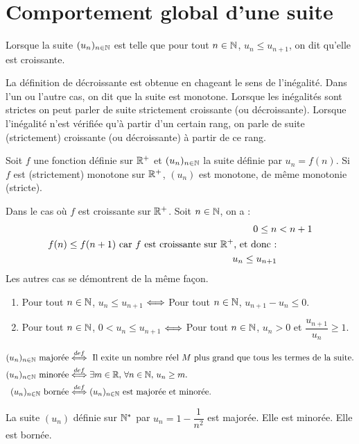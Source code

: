\documentclass[a4paper,11pt,DIV14,BCOR0mm]{scrartcl}
\begin{document}
\section{Comportement global d'une suite}
\begin{definition}
 Lorsque la suite $(u_n)_{n\in\mathbb{N}}$ est telle que pour tout $n\in\mathbb{N}$, $u_n\leq u_{n+1}$,
on dit qu'elle est croissante.
\end{definition}
La définition de décroissante est obtenue en chageant le sens de l'inégalité. Dans l'un ou l'autre
cas, on dit que la suite est monotone.
Lorsque les inégalités
sont strictes on peut parler de suite strictement croissante (ou décroissante). 
Lorsque l'inégalité n'est vérifiée
qu'à partir d'un certain rang, on parle de suite (strictement) croissante (ou décroissante) à partir 
de ce rang.
\begin{theoreme}
 Soit $f$ une fonction définie sur $\mathbb{R}^+$ et $(u_n)_{n\in\mathbb{N}}$ la suite définie par $u_n=f(n)$.
Si $f$ est (strictement) monotone sur $\mathbb{R}^+$, $(u_n)$ est monotone, de même monotonie (stricte). 
\end{theoreme}
\begin{demonstration}
 Dans le cas o\`u $f$ est croissante sur $\mathbb{R}^+$. Soit $n\in\mathbb{N}$, on a :
\begin{align*}
 0\leq n&<n+1\\
  f(n)\leq f(n+1)\text{ car $f$ est croissante sur $\mathbb{R}^+$, et donc :}\\
  u_n\leq u_{n+1}
\end{align*}
Les autres cas se démontrent de la même façon.
\end{demonstration}
\begin{theoreme}
\begin{enumerate}
 \item Pour tout $n\in\mathbb{N}$, $u_n\leq u_{n+1}$ $\Longleftrightarrow$ Pour tout $n\in\mathbb{N}$, $u_{n+1}-u_n\leq0$.
 \item Pour tout $n\in\mathbb{N}$, $0<u_n\leq u_{n+1}$ $\Longleftrightarrow$ Pour tout $n\in\mathbb{N}$, $u_n>0$ et $\dfrac{u_{n+1}}{u_n}\geq1$.
\end{enumerate}
\end{theoreme}

\begin{definition}
 \begin{align*}
  (u_n)_{n\in\mathbb{N}}\text{ majorée}&\stackrel{def}{\Longleftrightarrow}\text{ Il exite un nombre réel $M$ plus
 grand que tous les termes de la suite.}\\
  (u_n)_{n\in\mathbb{N}}\text{ minorée}&\stackrel{def}{\Longleftrightarrow}\exists m\in\mathbb{R},\,\forall n\in\mathbb{N},\,u_n\geq m.\\
(u_n)_{n\in\mathbb{N}}\text{ bornée}&\stackrel{def}{\Longleftrightarrow}(u_n)_{n\in\mathbb{N}}\text{ est majorée et minorée.}
\end{align*}
\end{definition}
\begin{exemple}
 La suite $(u_n)$ définie sur $\mathbb{N}^*$ par $u_n=1-\dfrac1{n^2}$ est majorée. Elle est minorée.
Elle est bornée.
\end{exemple}
\end{document}
